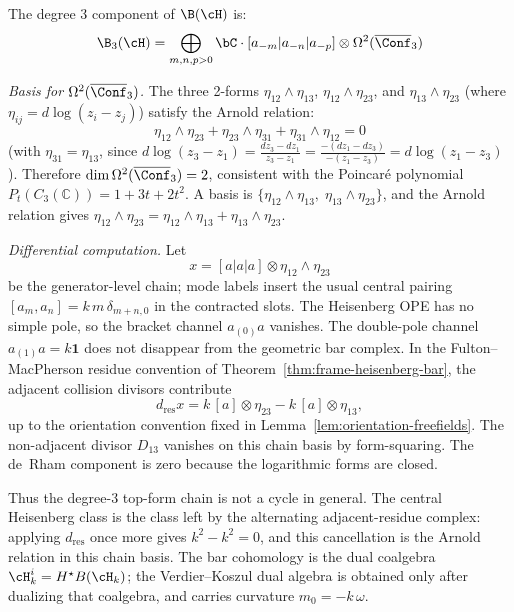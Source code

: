 \begin{computation}\label{comp:heisenberg-deg3-full}
The degree 3 component of $\B(\cH)$ is:
\[
\B_3(\cH) = \bigoplus_{m,n,p > 0} \bC \cdot [a_{-m}|a_{-n}|a_{-p}] \otimes \Omega^2(\overline{\Conf}_3)
\]

\emph{Basis for $\Omega^2(\overline{\Conf}_3)$.}
The three 2-forms $\eta_{12} \wedge \eta_{13}$, $\eta_{12} \wedge \eta_{23}$, and $\eta_{13} \wedge \eta_{23}$ (where $\eta_{ij} = d\log(z_i - z_j)$) satisfy the Arnold relation:
\[
\eta_{12} \wedge \eta_{23} + \eta_{23} \wedge \eta_{31} + \eta_{31} \wedge \eta_{12} = 0
\]
(with $\eta_{31} = \eta_{13}$, since $d\log(z_3 - z_1) = \frac{dz_3 - dz_1}{z_3 - z_1} = \frac{-(dz_1 - dz_3)}{-(z_1 - z_3)} = d\log(z_1 - z_3)$). Therefore $\dim \Omega^2(\overline{\Conf}_3) = 2$, consistent with the Poincar\'{e} polynomial $P_t(C_3(\mathbb{C})) = 1 + 3t + 2t^2$. A basis is $\{\eta_{12} \wedge \eta_{13},\; \eta_{13} \wedge \eta_{23}\}$, and the Arnold relation gives $\eta_{12} \wedge \eta_{23} = \eta_{12} \wedge \eta_{13} + \eta_{13} \wedge \eta_{23}$.

\emph{Differential computation.}
Let
\[
x=[a|a|a]\otimes\eta_{12}\wedge\eta_{23}
\]
be the generator-level chain; mode labels insert the usual central
pairing $[a_m,a_n]=k\,m\,\delta_{m+n,0}$ in the contracted slots.
The Heisenberg OPE has no simple pole, so the bracket channel
$a_{(0)}a$ vanishes. The double-pole channel
$a_{(1)}a=k\mathbf 1$ does not disappear from the geometric bar
complex. In the Fulton--MacPherson residue convention of
Theorem~\ref{thm:frame-heisenberg-bar}, the adjacent collision
divisors contribute
\[
d_{\mathrm{res}}x
 =
k\,[a]\otimes\eta_{23}
-k\,[a]\otimes\eta_{13},
\]
up to the orientation convention fixed in
Lemma~\ref{lem:orientation-freefields}. The non-adjacent divisor
$D_{13}$ vanishes on this chain basis by form-squaring. The
de~Rham component is zero because the logarithmic forms are closed.

Thus the degree-$3$ top-form chain is not a cycle in general. The
central Heisenberg class is the class left by the alternating
adjacent-residue complex: applying $d_{\mathrm{res}}$ once more gives
$k^2-k^2=0$, and this cancellation is the Arnold relation in this
chain basis. The bar cohomology is the dual coalgebra
$\cH_k^i=H^\star B(\cH_k)$; the Verdier--Koszul dual algebra is
obtained only after dualizing that coalgebra, and carries curvature
$m_0=-k\,\omega$.
\end{computation}

